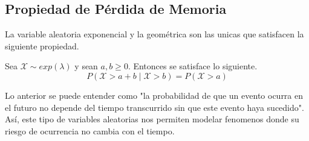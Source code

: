 \subsection{Propiedad de Pérdida de Memoria}

La variable aleatoria exponencial y la geométrica son las unicas que satisfacen la siguiente propiedad.

Sea $\mathcal X \sim exp(\lambda)$ y sean $a,b \ge 0$. Entonces se satisface lo siguiente.
\[P(\mathcal X > a + b \mid \mathcal X > b) = P(\mathcal X > a)\]

Lo anterior se puede entender como "la probabilidad de que un evento ocurra en el futuro no depende del tiempo transcurrido sin que este evento haya sucedido". Así, este tipo de variables aleatorias nos permiten modelar fenomenos donde su riesgo de ocurrencia no cambia con el tiempo.




